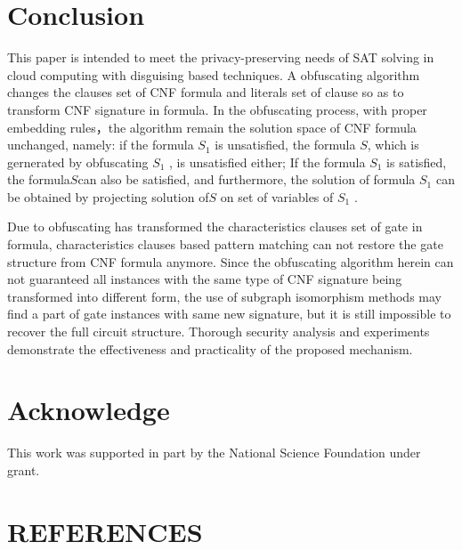 \documentclass[runningheads,a4paper]{llncs}
\begin{document}
\section{Conclusion} 

This paper is intended to meet the privacy-preserving needs of SAT solving in cloud computing with disguising based techniques. A obfuscating algorithm changes the clauses set of CNF formula and literals set of clause so as to transform CNF signature in formula. In the obfuscating process, with proper embedding rules，the algorithm remain the solution space of CNF formula unchanged, namely: if the formula $S_1$  is unsatisfied, the formula $S$, which is gernerated by obfuscating $S_1$ , is unsatisfied either; If the formula $S_1$  is satisfied, the formula$S$can also be satisfied, and furthermore, the solution of formula $S_1$  can be obtained by projecting solution of$S$ on set of variables of $S_1$  .

Due to obfuscating has transformed the characteristics clauses set of gate in formula, characteristics clauses based pattern matching can not restore the gate structure from CNF formula anymore. Since the obfuscating algorithm herein can not guaranteed all instances with the same type of CNF signature being transformed into different form, the use of subgraph isomorphism methods may find a part of gate instances with same new signature, but it is still impossible to recover the full circuit structure. Thorough security analysis and experiments demonstrate the effectiveness and practicality of the proposed mechanism.
\section{Acknowledge} 

This work was supported in part by the National Science Foundation under grant.

\section{REFERENCES} 
\end{document}

